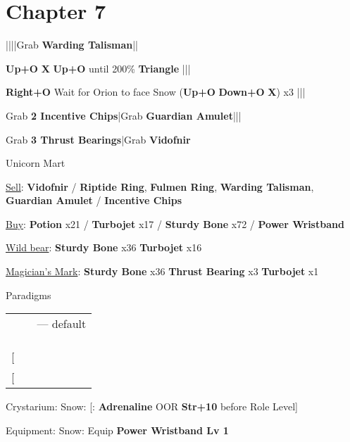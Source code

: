 \section{Chapter 7}
\begin{mainlist}
	\item {}|\skip|\skip|\skip|Grab \textbf{Warding Talisman}|\skip|
	\item {} \textbf{Up+O} \to \textbf{X} \to \textbf{Up+O} until 200\% \to \textbf{Triangle} |\skip||
	\item {} \textbf{Right+O} \to Wait for Orion to face Snow \to (\textbf{Up+O} \to \textbf{Down+O} \to \textbf{X}) x3 |\skip||
	\item Grab \textbf{2 Incentive Chips}|Grab \textbf{Guardian Amulet}|\skip||\skip
	\item Grab \textbf{3 Thrust Bearings}|Grab \textbf{Vidofnir}
\end{mainlist}
\begin{shop}{Unicorn Mart}
	\item \underline{Sell}: \textbf{Vidofnir} / \textbf{Riptide Ring}, \textbf{Fulmen Ring}, \textbf{Warding Talisman}, \textbf{Guardian Amulet} / \textbf{Incentive Chips}
	\item \underline{Buy}: \textbf{\textbf{Potion}} x21 / \textbf{Turbojet} x17 / \textbf{Sturdy Bone} x72 / \textbf{Power Wristband}
\end{shop}
\begin{upgrade}
	\item \underline{Wild bear}: \textbf{Sturdy Bone} x36 \to \textbf{Turbojet} x16
	\item \underline{Magician's Mark}: \textbf{Sturdy Bone} x36 \to \textbf{Thrust Bearing} x3 \to \textbf{Turbojet} x1
\end{upgrade}
\begin{menu}
	\item Paradigms
	\begin{tabular}{ccl}
		\com       & \rav & --- default \\
		\com       & \med &             \\
		\sen       & \med &             \\
		\sen       & \syn &             \\
		{[}\rav{]} & \rav &             \\
		{[}\rav{]} & \rav &
	\end{tabular}
	\item Crystarium: Snow: [\com: \textbf{Adrenaline} OOR \to \textbf{Str+10} before Role Level]
	\item Equipment: Snow: Equip \textbf{Power Wristband Lv 1}
\end{menu}
